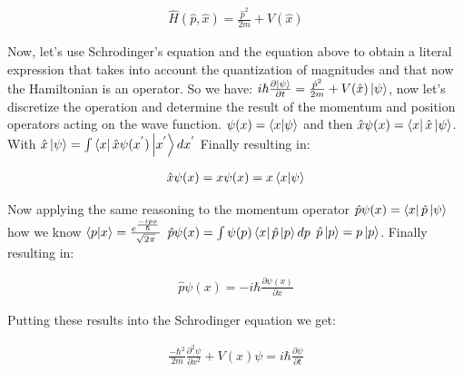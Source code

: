 \documentclass[
  journal=largetwo,
  year=2023,
]{cup-journal}
\begin{document}
\begin{equation}
  \begin{aligned}\label{eq:4}
    \hat{H}(\hat{p}, \hat{x}) = \frac{\hat{p}^2}{2m} + V(\hat{x})
  \end{aligned}
\end{equation}

Now, let's use Schrodinger's equation and the equation above to obtain a literal expression that takes into account the quantization of magnitudes and that now the Hamiltonian is an operator. So we have: \(i\hbar\frac{\partial \ket{\psi}}{\partial t} = \frac{\hat{p}^2}{2m} + V(\hat{x})\ket{\psi}\), now let's discretize the operation and determine the result of the momentum and position operators acting on the wave function. \(\psi(x) = \bra{x}\ket{\psi}\) and then \(\hat{x}\psi(x) = \bra{x}\hat{x}\ket{\psi}\). With \(\hat{x}\ket{\psi} = \int{\bra{x}\hat{x}\psi(x^{'})\ket{x^{'}}dx^{'}}\) Finally resulting in:

\begin{equation}
  \begin{aligned}\label{eq:5}
    \hat{x}\psi(x) = x\psi(x) = x\braket{x}{\psi}
  \end{aligned}
\end{equation}

Now applying the same reasoning to the momentum operator \(\hat{p}\psi(x) = \bra{x}\hat{p}\ket{\psi}\) how we know \(\braket{p}{x} = \frac{e^{\frac{-ipx}{\hbar}}}{\sqrt{2\pi}}\) \(\hat{p}\psi(x) = \int{\psi(p)\bra{x}\hat{p}\ket{p}dp}\)
\(\hat{p}\ket{p} = p\ket{p}\). Finally resulting in:

\begin{equation}
  \begin{aligned}\label{eq:6}
    \hat{p}\psi(x) = -i\hbar\frac{\partial\psi(x)}{\partial x}
  \end{aligned}
\end{equation}

Putting these results into the Schrodinger equation we get:

\begin{equation}
  \begin{aligned}\label{eq:7}
    \frac{-\hbar^{2}}{2m}\frac{\partial^{2}\psi}{\partial x^{2}} + V(x)\psi = i\hbar\frac{\partial \psi}{\partial t}
  \end{aligned}
\end{equation}
\end{document}
